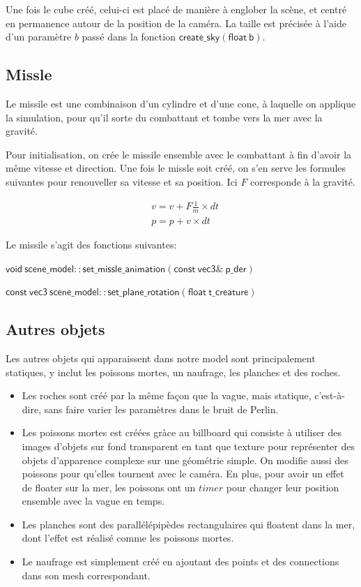 \documentclass[utf8, a4paper, 12pt]{article}
\begin{document}
Une fois le cube créé, celui-ci est placé de manière à englober la scène, et centré en permanence autour de la position de la caméra. La taille est précisée à l'aide d'un paramètre $b$ passé dans la fonction $\mathsf{create\_sky(float\ b)}$.

\subsection{Missle}
Le missile est une combinaison d'un cylindre et d'une cone, à laquelle on applique la simulation, pour qu'il sorte du combattant et tombe vers la mer avec la gravité.

Pour initialisation, on crée le missile ensemble avec le combattant à fin d'avoir la même vitesse et direction. Une fois le missle soit créé, on s'en serve les formules suivantes pour renouveller sa vitesse et sa position. Ici $F$ corresponde à la gravité.

\begin{align*}
    &v = v + F \frac{1}{m} \times dt \\
    &p = p + v \times dt    
\end{align*}

Le missile s'agit des fonctions suivantes:

$\mathsf{void\ scene\_model::set\_missle\_animation(const\ vec3\&\  p\_der)}$

$\mathsf{const\ vec3\ scene\_model::set\_plane\_rotation(float\ t\_creature)}$

\subsection{Autres objets}
Les autres objets qui apparaissent dans notre model sont principalement statiques, y inclut les poissons mortes, un naufrage, les planches et des roches.

\begin{itemize}
    \item Les roches sont créé par la même façon que la vague, mais statique, c'est-à-dire, sans faire varier les paramètres dans le bruit de Perlin. 
    \item Les poissons mortes est créées gràce au billboard qui consiste à utiliser des images d’objets sur fond transparent en tant que texture pour représenter des objets d’apparence complexe sur une géométrie simple. On modifie aussi des poissons pour qu'elles tournent avec le caméra. En plus, pour avoir un effet de floater sur la mer, les poissons ont un $timer$ pour changer leur position ensemble avec la vague en temps.  
    \item Les planches sont des parallélépipèdes rectangulaires qui floatent dans la mer, dont l'effet est réalisé comme les poissons mortes.
    \item Le naufrage est simplement créé en ajoutant des points et des connections dans son mesh correspondant.
\end{itemize}
\end{document}
